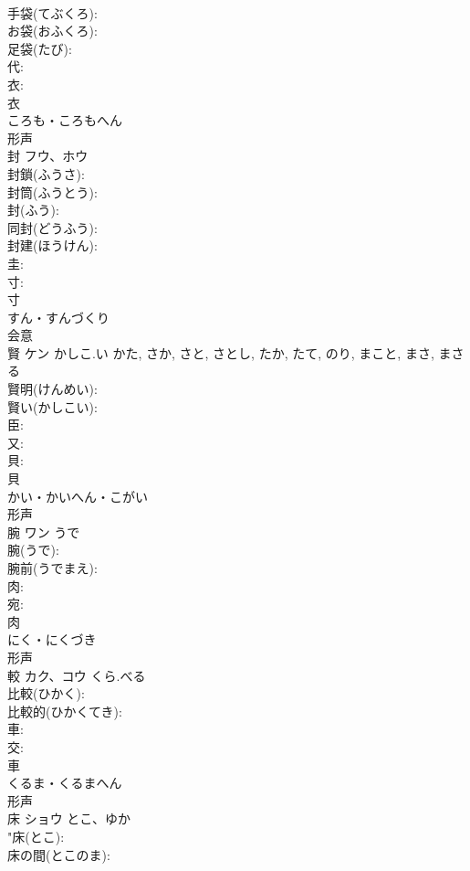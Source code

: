 \documentclass[8pt]{extreport}
\begin{document}
\begin{CJK}{UTF8}{min}
\\	手袋(てぶくろ): 
\\	お袋(おふくろ): 
\\	足袋(たび): 
\\	代: 
\\	衣: 
\\	衣	
\\	ころも・ころもへん	
\\	形声 
\\	封	フウ、ホウ			
\\	封鎖(ふうさ): 
\\	封筒(ふうとう): 
\\	封(ふう): 
\\	同封(どうふう): 
\\	封建(ほうけん): 
\\	圭: 
\\	寸: 
\\	寸	
\\	すん・すんづくり	
\\	会意 
\\	賢	ケン	かしこ.い	かた, さか, さと, さとし, たか, たて, のり, まこと, まさ, まさる	
\\	賢明(けんめい): 
\\	賢い(かしこい): 
\\	臣: 
\\	又: 
\\	貝: 
\\	貝	
\\	かい・かいへん・こがい	
\\	形声 
\\	腕	ワン	うで		
\\	腕(うで): 
\\	腕前(うでまえ): 
\\	肉: 
\\	宛: 
\\	肉	
\\	にく・にくづき	
\\	形声 
\\	較	カク、コウ	くら.べる		
\\	比較(ひかく): 
\\	比較的(ひかくてき): 
\\	車: 
\\	交: 
\\	車	
\\	くるま・くるまへん	
\\	形声 
\\	床	ショウ	とこ、ゆか		
\\	"床(とこ): 
\\	床の間(とこのま): 

\end{CJK}
\end{document}
